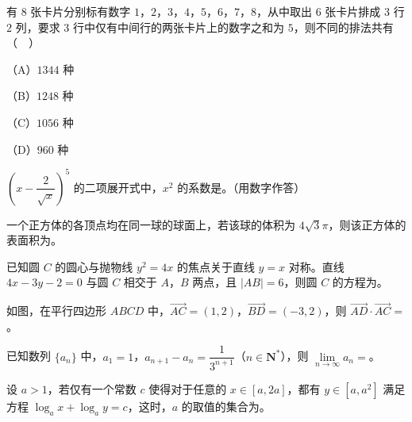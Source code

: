 \begin{question}
有 $8$ 张卡片分别标有数字 $1$，$2$，$3$，$4$，$5$，$6$，$7$，$8$，从中取出 $6$ 张卡片排成 $3$ 行 $2$ 列，要求 $3$ 行中仅有中间行的两张卡片上的数字之和为 $5$，则不同的排法共有（　）

（A）$1344$ 种

（B）$1248$ 种

（C）$1056$ 种

（D）$960$ 种

\end{question}

\begin{question}
$\left(x-\dfrac2{\sqrt x}\right)^5$ 的二项展开式中，$x^2$ 的系数是\gkblank{}。（用数字作答）

\end{question}
\begin{question}
一个正方体的各顶点均在同一球的球面上，若该球的体积为 $4\sqrt3\pi$，则该正方体的表面积为\gkblank{}。

\end{question}
\begingroup
\renewenvironment{question}{\Needspace{0.44\textheight}}{}
\begin{question}
已知圆 $C$ 的圆心与抛物线 $y^2=4x$ 的焦点关于直线 $y=x$ 对称。直线 $4x-3y-2=0$ 与圆 $C$ 相交于 $A$，$B$ 两点，且 $|AB|=6$，则圆 $C$ 的方程为\gkblank{}。

\Needspace{0.4\textheight}
\end{question}
\endgroup
\begin{question}
如图，在平行四边形 $ABCD$ 中，$\overrightarrow{AC}=(1,2)$，$\overrightarrow{BD}=(-3,2)$，则 $\overrightarrow{AD}\cdot\overrightarrow{AC}=$\gkblank{}。
\nopagebreak[4]
\begin{center}\end{center}
\nopagebreak[4]
\end{question}
\begin{question}
已知数列 $\{a_n\}$ 中，$a_1=1$，$a_{n+1}-a_n=\dfrac1{3^{n+1}}$（$n\in\mathbf N^*$），则 $\lim\limits_{n\to\infty}a_n=$\gkblank{}。

\end{question}
\begin{question}
设 $a>1$，若仅有一个常数 $c$ 使得对于任意的 $x\in[a,2a]$，都有 $y\in[a,a^2]$ 满足方程 $\log_ax+\log_ay=c$，这时，$a$ 的取值的集合为\gkblank{}。

\end{question}

